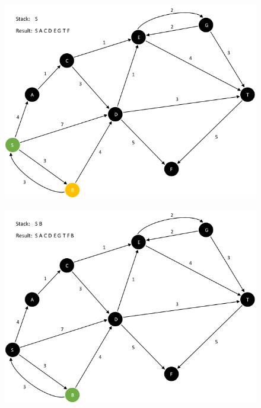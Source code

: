 \documentclass{article}
\begin{document}
\begin{enumerate}[leftmargin=\labelsep]
\begin{figure}[H]
\centering
\includegraphics[scale=0.6]{images/Q5/a/15.png}
\end{figure}

\begin{figure}[H]
\centering
\includegraphics[scale=0.6]{images/Q5/a/16.png}
\end{figure}


\end{enumerate}
\end{document}
